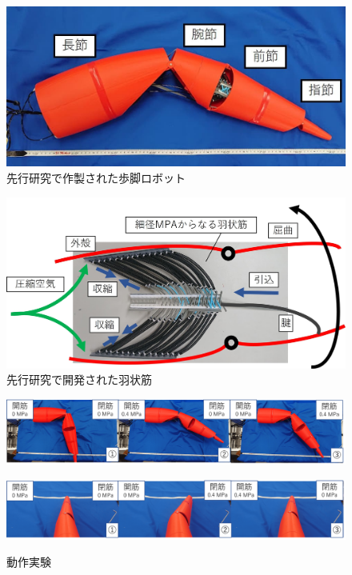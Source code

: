 \begin{figure}[t]
  \centering
  \includegraphics[scale=0.3]{image/robot_scale.JPG}
  \vspace{3mm}
  \caption{先行研究で作製された歩脚ロボット\cite{hasegawa}}
  \label{fig:senkoukenkyuu}
\end{figure}
\begin{figure}[t]
  \centering
  \vspace{3mm}
  \includegraphics[scale=0.14]{image/mosiki.JPG}
  \caption{先行研究で開発された羽状筋\cite{hasegawa}}
  \label{fig:ujyoukin}
\end{figure}
\begin{figure}[tbp]
  \begin{minipage}{1\hsize}
    \centering
    \includegraphics[scale=0.12]{image/move1all.png}
    \label{fig:move1}
  \end{minipage}
  \begin{minipage}{1\hsize}
    \centering
    \includegraphics[scale=0.12]{image/move2all.png}
    \label{fig:move2}
  \end{minipage}
%
  \caption{動作実験}
  \label{fig:movea12}
\end{figure}
%
